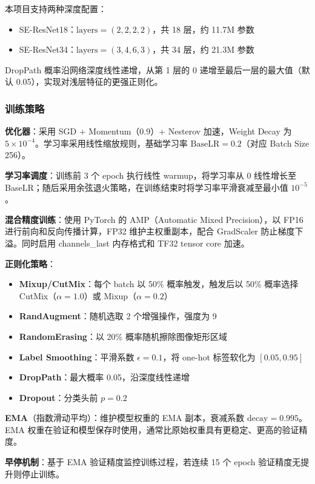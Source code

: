 \documentclass[12pt,a4paper]{ctexart}
\begin{document}
本项目支持两种深度配置：
\begin{itemize}
    \item SE-ResNet18：$\text{layers}=(2,2,2,2)$，共 18 层，约 11.7M 参数
    \item SE-ResNet34：$\text{layers}=(3,4,6,3)$，共 34 层，约 21.3M 参数
\end{itemize}

DropPath 概率沿网络深度线性递增，从第 1 层的 0 递增至最后一层的最大值（默认 0.05），实现对浅层特征的更强正则化。

\subsubsection{训练策略}

\textbf{优化器}：采用 SGD + Momentum（0.9）+ Nesterov 加速，Weight Decay 为 $5\times10^{-4}$。学习率采用线性缩放规则，基础学习率 $\text{BaseLR} = 0.2$（对应 Batch Size 256）。

\textbf{学习率调度}：训练前 3 个 epoch 执行线性 warmup，将学习率从 0 线性增长至 BaseLR；随后采用余弦退火策略，在训练结束时将学习率平滑衰减至最小值 $10^{-5}$。

\textbf{混合精度训练}：使用 PyTorch 的 AMP（Automatic Mixed Precision），以 FP16 进行前向和反向传播计算，FP32 维护主权重副本，配合 GradScaler 防止梯度下溢。同时启用 channels\_last 内存格式和 TF32 tensor core 加速。

\textbf{正则化策略}：
\begin{itemize}
    \item \textbf{Mixup/CutMix}：每个 batch 以 50\% 概率触发，触发后以 50\% 概率选择 CutMix（$\alpha=1.0$）或 Mixup（$\alpha=0.2$）
    \item \textbf{RandAugment}：随机选取 2 个增强操作，强度为 9
    \item \textbf{RandomErasing}：以 20\% 概率随机擦除图像矩形区域
    \item \textbf{Label Smoothing}：平滑系数 $\epsilon=0.1$，将 one-hot 标签软化为 $[0.05, 0.95]$
    \item \textbf{DropPath}：最大概率 0.05，沿深度线性递增
    \item \textbf{Dropout}：分类头前 $p=0.2$
\end{itemize}

\textbf{EMA}（指数滑动平均）：维护模型权重的 EMA 副本，衰减系数 $\text{decay}=0.995$。EMA 权重在验证和模型保存时使用，通常比原始权重具有更稳定、更高的验证精度。

\textbf{早停机制}：基于 EMA 验证精度监控训练过程，若连续 15 个 epoch 验证精度无提升则停止训练。
\end{document}
